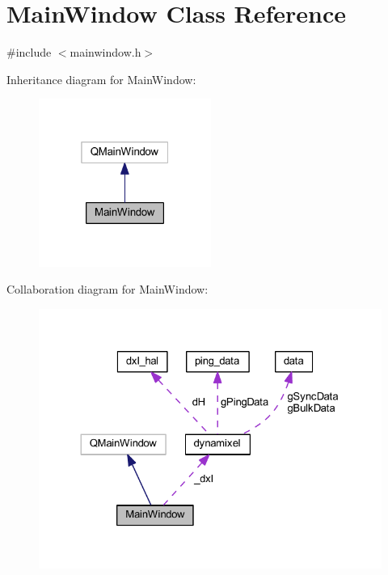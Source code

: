 \hypertarget{class_main_window}{}\section{Main\+Window Class Reference}
\label{class_main_window}


{\ttfamily \#include $<$mainwindow.\+h$>$}



Inheritance diagram for Main\+Window\+:\nopagebreak
\begin{figure}[H]
\begin{center}
\leavevmode
\includegraphics[width=160pt]{de/d4b/class_main_window__inherit__graph}
\end{center}
\end{figure}


Collaboration diagram for Main\+Window\+:\nopagebreak
\begin{figure}[H]
\begin{center}
\leavevmode
\includegraphics[width=324pt]{d0/db8/class_main_window__coll__graph}
\end{center}
\end{figure}
